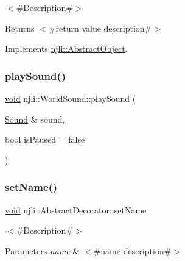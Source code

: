 $<$\#\+Description\#$>$

\begin{DoxyReturn}{Returns}
$<$\#return value description\#$>$ 
\end{DoxyReturn}


Implements \mbox{\hyperlink{classnjli_1_1_abstract_object_afc07f4138bd3003910e7aa7fa0fe11ad}{njli\+::\+Abstract\+Object}}.

\mbox{\label{classnjli_1_1_world_sound_a6d5b69217a2ad24faca15ade9c7b5c63}} 
\subsubsection{\texorpdfstring{play\+Sound()}{playSound()}}
{\footnotesize\ttfamily \mbox{\hyperlink{_thread_8h_af1e856da2e658414cb2456cb6f7ebc66}{void}} njli\+::\+World\+Sound\+::play\+Sound (\begin{DoxyParamCaption}\item[{\mbox{\hyperlink{classnjli_1_1_sound}{Sound}} \&}]{sound,  }\item[{bool}]{is\+Paused = {\ttfamily false} }\end{DoxyParamCaption})\hspace{0.3cm}{\ttfamily [protected]}}

\mbox{\label{classnjli_1_1_world_sound_a087eb5f8d9f51cc476f12f1d10a3cb95}} 
\subsubsection{\texorpdfstring{set\+Name()}{setName()}}
{\footnotesize\ttfamily \mbox{\hyperlink{_thread_8h_af1e856da2e658414cb2456cb6f7ebc66}{void}} njli\+::\+Abstract\+Decorator\+::set\+Name}

$<$\#\+Description\#$>$


\begin{DoxyParams}{Parameters}
{\em name} & $<$\#name description\#$>$ \\
\hline
\end{DoxyParams}
\mbox{\label{classnjli_1_1_world_sound_a7911347b81467da066b5f8f21767a7f7}} 
